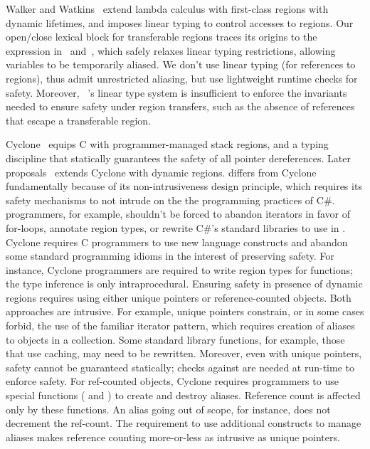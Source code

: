 Walker and Watkins~\cite{WW01} extend lambda calculus with first-class regions
with dynamic lifetimes, and imposes linear typing to control accesses to regions.
Our open/close lexical block for transferable regions traces its origins to the 
expression in~\cite{WW01} and~\cite{wadler90}, which safely relaxes
linear typing restrictions, allowing variables to be temporarily
aliased.
We don't use linear typing (for references to regions), thus admit unrestricted aliasing,
but use lightweight runtime checks for safety.
Moreover, ~\cite{WW01}'s linear type system is insufficient to enforce
the invariants needed to ensure safety under region transfers, such as
the absence of references that escape a transferable region.

Cyclone~\cite{cyclone02} equips C with programmer-managed stack
regions, and a typing discipline that statically guarantees the safety
of all pointer dereferences. Later
proposals~\cite{cyclone04,cycloneSCP} extends Cyclone with dynamic
regions. \name differs from Cyclone fundamentally because of its
non-intrusiveness design principle, which requires its safety
mechanisms to not intrude on the the programming practices of C\#.
\name programmers, for example, shouldn’t be forced to abandon
iterators in favor of for-loops, annotate region types, or rewrite
C\#'s standard libraries to use in \name. Cyclone requires C
programmers to use new language constructs and abandon some standard
programming idioms in the interest of preserving safety. For instance,
Cyclone programmers are required to write region types for functions;
the type inference is only intraprocedural. Ensuring safety in
presence of dynamic regions requires using either unique pointers or
reference-counted objects.  Both approaches are intrusive. For
example, unique pointers constrain, or in some cases forbid, the use
of the familiar iterator pattern, which requires creation of aliases
to objects in a collection. Some standard library functions, for
example, those that use caching, may need to be rewritten.  Moreover,
even with unique pointers, safety cannot be guaranteed statically;
checks against  are needed at run-time to enforce safety. For
ref-counted objects, Cyclone requires programmers to use special
functions ( and ) to create and
destroy aliases.  Reference count is affected only by these functions.
An alias going out of scope, for instance, does not decrement the
ref-count. The requirement to use additional constructs
to manage aliases makes reference counting more-or-less as intrusive
as unique pointers.

